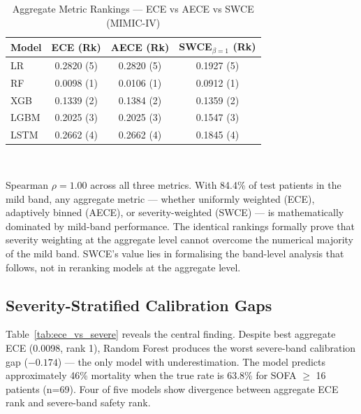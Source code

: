 \documentclass{ieeeaccess}
\begin{document}
\begin{table}[t!]
\caption{Aggregate Metric Rankings — ECE vs AECE vs SWCE (MIMIC-IV)}
\label{tab:rankings}
\centering
\footnotesize
\setlength{\tabcolsep}{2.5pt}
\begin{tabularx}{\columnwidth}{@{}lccc@{}}
\toprule
\textbf{Model} & \textbf{ECE (Rk)} & \textbf{AECE (Rk)} & \textbf{SWCE$_{\beta=1}$ (Rk)} \\
\midrule
LR   & 0.2820 (5) & 0.2820 (5) & 0.1927 (5) \\
RF   & 0.0098 (1) & 0.0106 (1) & 0.0912 (1) \\
XGB  & 0.1339 (2) & 0.1384 (2) & 0.1359 (2) \\
LGBM & 0.2025 (3) & 0.2025 (3) & 0.1547 (3) \\
LSTM & 0.2662 (4) & 0.2662 (4) & 0.1845 (4) \\
\bottomrule
\end{tabularx}
\\[4pt]
\parbox{\columnwidth}{\footnotesize Spearman $\rho = 1.00$ across all three metrics. With 84.4\% of test patients in the mild band, any aggregate metric — whether uniformly weighted (ECE), adaptively binned (AECE), or severity-weighted (SWCE) — is mathematically dominated by mild-band performance. The identical rankings formally prove that severity weighting at the aggregate level cannot overcome the numerical majority of the mild band. SWCE's value lies in formalising the band-level analysis that follows, not in reranking models at the aggregate level.}
\end{table}

\subsection{Severity-Stratified Calibration Gaps}

Table~\ref{tab:ece_vs_severe} reveals the central finding. Despite best aggregate ECE (0.0098, rank 1), Random Forest produces the worst severe-band calibration gap ($-0.174$) — the only model with underestimation. The model predicts approximately 46\% mortality when the true rate is 63.8\% for SOFA $\ge$ 16 patients (n=69). Four of five models show divergence between aggregate ECE rank and severe-band safety rank.
\end{document}
